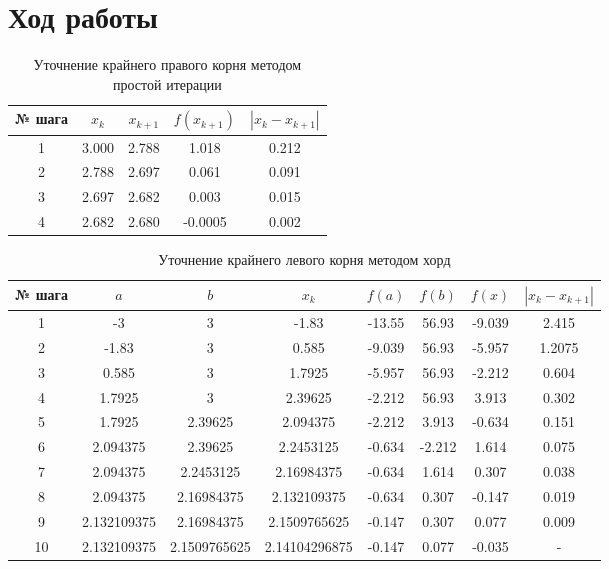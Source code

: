 \documentclass[12pt]{report}
\begin{document}
	\section*{Ход работы}
	\begin{table}[h!]
		\centering
		\begin{tabular}{|c|c|c|c|c|}
			\hline
			№ шага & $x_k$ & $x_{k+1}$ & $f(x_{k+1})$ & $|x_k - x_{k+1}|$ \\ \hline
			1 & 3.000 & 2.788 & 1.018 & 0.212 \\ \hline
			2 & 2.788 & 2.697 & 0.061 & 0.091 \\ \hline
			3 & 2.697 & 2.682 & 0.003 & 0.015 \\ \hline
			4 & 2.682 & 2.680 & -0.0005 & 0.002 \\ \hline
		\end{tabular}
		\caption{Уточнение крайнего правого корня методом простой итерации}
		\label{tab:1}
	\end{table}

	\begin{table}[h!]
		\centering
		\begin{tabular}{|c|c|c|c|c|c|c|c|}
			\hline
			№ шага & $a$ & $b$ & $x_k$ & $f(a)$ & $f(b)$ & $f(x)$ & $|x_k - x_{k+1}|$ \\ \hline
			
			1 & -3 & 3 & -1.83 & -13.55 & 56.93 & -9.039 & 2.415\\ \hline
			
			2 & -1.83 & 3 & 0.585 & -9.039 & 56.93 & -5.957 & 1.2075 \\ \hline
			
			3 & 0.585 & 3 & 1.7925 & -5.957 & 56.93 & -2.212 & 0.604 \\ \hline
			
			4 & 1.7925 & 3 & 2.39625 & -2.212 & 56.93 & 3.913 & 0.302 \\ \hline
			
			5 & 1.7925 & 2.39625 & 2.094375 & -2.212 & 3.913 & -0.634 & 0.151 \\ \hline
			
			6 & 2.094375 & 2.39625 & 2.2453125 & -0.634 & -2.212 & 1.614 & 0.075 \\ \hline
			
			7 & 2.094375 & 2.2453125 & 2.16984375 & -0.634 & 1.614 & 0.307 & 0.038 \\ \hline
			
			8 & 2.094375 & 2.16984375 & 2.132109375 & -0.634 & 0.307 & -0.147 & 0.019 \\ \hline
			
			9 & 2.132109375 & 2.16984375 & 2.1509765625 & -0.147 & 0.307 & 0.077 & 0.009 \\ \hline
			
			10 & 2.132109375 & 2.1509765625 & 2.14104296875 & -0.147 & 0.077 & -0.035 & - \\ \hline
		\end{tabular}
		\caption{Уточнение крайнего левого корня методом хорд}
		\label{tab:2}
	\end{table}	
	
\end{document}
